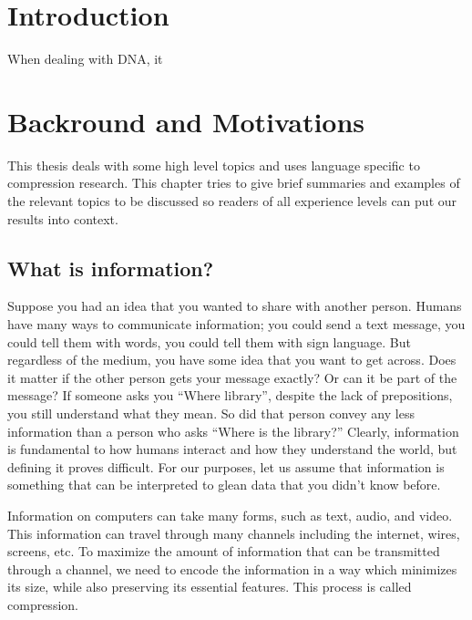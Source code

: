 \documentclass[12pt,twoside]{reedthesis}
\begin{document}
\hypertarget{introduction}{%
\chapter*{Introduction}\label{introduction}}

When dealing with DNA, it

\hypertarget{backround-and-motivations}{%
\chapter{Backround and Motivations}\label{backround-and-motivations}}

This thesis deals with some high level topics and uses language specific to compression research. This chapter tries to give brief summaries and examples of the relevant topics to be discussed so readers of all experience levels can put our results into context.

\hypertarget{what-is-information}{%
\section{What is information?}\label{what-is-information}}

Suppose you had an idea that you wanted to share with another person. Humans have many ways to communicate information; you could send a text message, you could tell them with words, you could tell them with sign language. But regardless of the medium, you have some idea that you want to get across. Does it matter if the other person gets your message exactly? Or can it be part of the message? If someone asks you ``Where library'', despite the lack of prepositions, you still understand what they mean. So did that person convey any less information than a person who asks ``Where is the library?''
Clearly, information is fundamental to how humans interact and how they understand the world, but defining it proves difficult. For our purposes, let us assume that information is something that can be interpreted to glean data that you didn't know before.

Information on computers can take many forms, such as text, audio, and video. This information can travel through many channels including the internet, wires, screens, etc. To maximize the amount of information that can be transmitted through a channel, we need to encode the information in a way which minimizes its size, while also preserving its essential features. This process is called compression.
\end{document}
